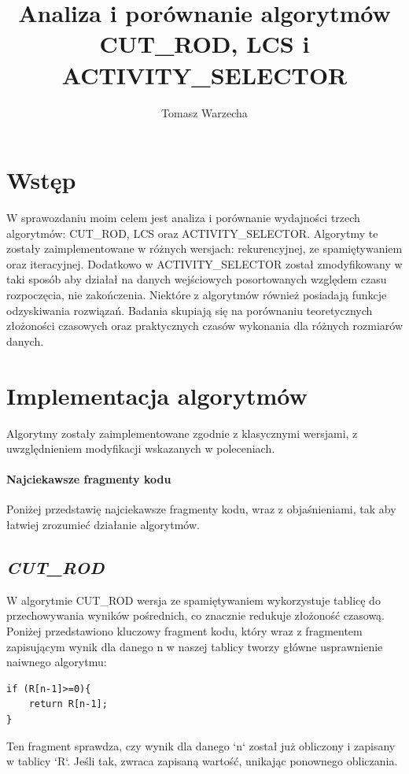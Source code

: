 \documentclass{article}
\title{Analiza i porównanie algorytmów CUT\_ROD, LCS i ACTIVITY\_SELECTOR}
\author{Tomasz Warzecha}
\begin{document}
	
	\maketitle
	
	\section{Wstęp}
	W sprawozdaniu moim celem jest analiza i porównanie wydajności trzech algorytmów: CUT\_ROD, LCS oraz ACTIVITY\_SELECTOR. Algorytmy te zostały zaimplementowane w różnych wersjach: rekurencyjnej, ze spamiętywaniem oraz iteracyjnej. Dodatkowo w ACTIVITY\_SELECTOR został zmodyfikowany w taki sposób aby działał na danych wejściowych posortowanych względem czasu rozpoczęcia, nie zakończenia. Niektóre z algorytmów również posiadają funkcje odzyskiwania rozwiązań. Badania skupiają się na porównaniu teoretycznych złożoności czasowych oraz praktycznych czasów wykonania dla różnych rozmiarów danych.
	
	\section{Implementacja algorytmów}
	Algorytmy zostały zaimplementowane zgodnie z klasycznymi wersjami, z uwzględnieniem modyfikacji wskazanych w poleceniach.
	
	\paragraph{Najciekawsze fragmenty kodu\\}
	Poniżej przedstawię najciekawsze fragmenty kodu, wraz z objaśnieniami, tak aby łatwiej zrozumieć działanie algorytmów.
	
	\subsection{\textit{CUT\_ROD}}
	W algorytmie CUT\_ROD wersja ze spamiętywaniem wykorzystuje tablicę do przechowywania wyników pośrednich, co znacznie redukuje złożoność czasową. Poniżej przedstawiono kluczowy fragment kodu, który wraz z fragmentem zapisującym wynik dla danego n w naszej tablicy tworzy główne usprawnienie naiwnego algorytmu:
	\newpage
	\begin{lstlisting}
if (R[n-1]>=0){
	return R[n-1];
}
	\end{lstlisting}
	Ten fragment sprawdza, czy wynik dla danego `n` został już obliczony i zapisany w tablicy `R`. Jeśli tak, zwraca zapisaną wartość, unikając ponownego obliczania.
	
\end{document}
